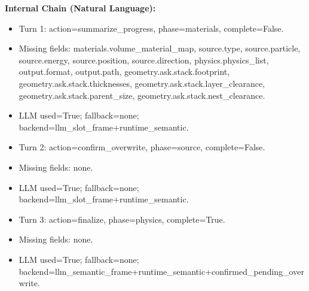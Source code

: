 \documentclass[11pt]{ctexart}
\begin{document}
\textbf{Internal Chain (Natural Language):}
\begin{itemize}
\item Turn 1: action=summarize\_progress, phase=materials, complete=False.
\item Missing fields: materials.volume\_material\_map, source.type, source.particle, source.energy, source.position, source.direction, physics.physics\_list, output.format, output.path, geometry.ask.stack.footprint, geometry.ask.stack.thicknesses, geometry.ask.stack.layer\_clearance, geometry.ask.stack.parent\_size, geometry.ask.stack.nest\_clearance.
\item LLM used=True; fallback=none; backend=llm\_slot\_frame+runtime\_semantic.
\item Turn 2: action=confirm\_overwrite, phase=source, complete=False.
\item Missing fields: none.
\item LLM used=True; fallback=none; backend=llm\_slot\_frame+runtime\_semantic.
\item Turn 3: action=finalize, phase=physics, complete=True.
\item Missing fields: none.
\item LLM used=True; fallback=none; backend=llm\_semantic\_frame+runtime\_semantic+confirmed\_pending\_overwrite.
\end{itemize}
\end{document}
